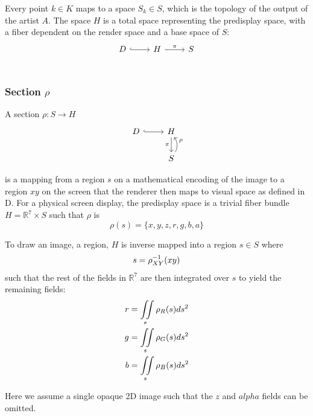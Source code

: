\documentclass[../main.tex]{subfiles}
\begin{document}
Every point $k \in K$ maps to a space $S_{k} \in S$, which is the topology of the output of the artist $A$. The space $H$ is a total space representing the predisplay space, with a fiber dependent on the render space and a base space of $S$:
\begin{equation}
    \begin{tikzcd}
        D \arrow[r, hook] & H \arrow[r, "\pi"] &S\\   
        \end{tikzcd}
\end{equation}

\subsubsection{Section $\rho$}

A section $\rho: S \rightarrow H$
\begin{equation}
    \begin{tikzcd}
        D \arrow[r, hook] & H \arrow[d, "\pi"']              \\
                          & S \arrow[u, "\rho"', bend right]
        \end{tikzcd}
\end{equation}

 is a mapping from a region $s$ on a mathematical encoding of the image to a region $xy$ on the screen that the renderer then maps to visual space as defined in D. For a physical screen display, the predisplay space is a trivial fiber bundle $H=\mathbb{R}^{7}\times S$ such that $\rho$ is
\begin{equation}
    \rho(s)  = \{x, y, z, r, g, b, a\}
    \label{eq:rho}
\end{equation}

To draw an image, a region, $H$ is inverse mapped into a region $s \in S$ where
\begin{equation}
s = \rho^{-1}_{\tiny{XY}}(xy)
\end{equation}
such that the rest of the fields in $\mathbb{R}^{7}$ are then integrated over $s$ to yield the remaining fields:
\begin{align}
    r &= \iint\limits_s \rho_{\tiny{R}}(s)ds^{2}\\
    g &= \iint\limits_s \rho_{\tiny{G}}(s)ds^{2}\\
    b &= \iint\limits_s \rho_{\tiny{B}}(s)ds^{2}
\end{align}

Here we assume a single opaque 2D image such that the $z$ and $alpha$ fields can be omitted. 
\end{document}
